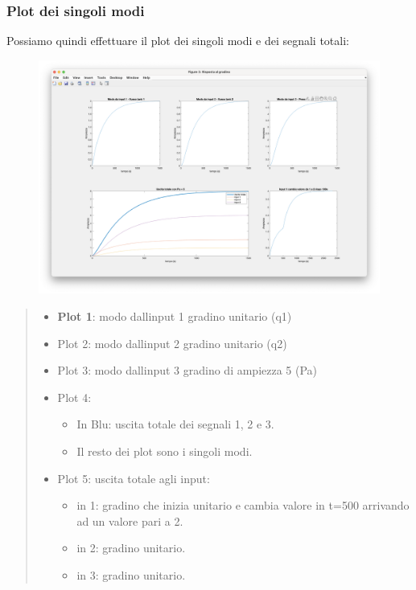 \documentclass[
]{article}
\begin{document}
\newpage

\hypertarget{plot-dei-singoli-modi}{%
\subsubsection{Plot dei singoli modi}\label{plot-dei-singoli-modi}}

Possiamo quindi effettuare il plot dei singoli modi e dei segnali
totali:

\begin{figure}
    \centering
    \includegraphics[width=0.9\linewidth]{images/image-20240106113118575.png}
    
    
\end{figure}

\begin{quote}
\begin{itemize}
\item
  \textbf{Plot 1}: modo dall\textquotesingle input 1 gradino unitario
  (q1)
\item
  Plot 2: modo dall\textquotesingle input 2 gradino unitario (q2)
\item
  Plot 3: modo dall\textquotesingle input 3 gradino di ampiezza 5 (Pa)
\item
  Plot 4:

  \begin{itemize}
  \item
    In Blu: uscita totale dei segnali 1, 2 e 3.
  \item
    Il resto dei plot sono i singoli modi.
  \end{itemize}
\item
  Plot 5: uscita totale agli input:

  \begin{itemize}
  \item
    in 1: gradino che inizia unitario e cambia valore in t=500 arrivando
    ad un valore pari a 2.
  \item
    in 2: gradino unitario.
  \item
    in 3: gradino unitario.
  \end{itemize}
\end{itemize}
\end{quote}
\end{document}
